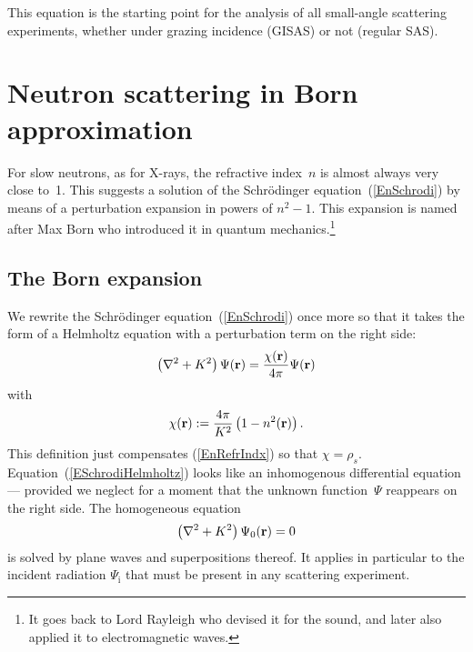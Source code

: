 This equation is the starting point for the analysis of all
small-angle scattering experiments,
whether under grazing incidence (GISAS) or not (regular SAS).


\section{Neutron scattering in Born approximation}

For slow neutrons, as for X-rays, the refractive index~$n$ is almost always
very close to~1.
This suggests a solution of the Schrödinger equation~(\ref{EnSchrodi})
by means of a perturbation expansion in powers of $n^2-1$.
This expansion is named after Max Born
who introduced it in quantum mechanics.\footnote
{It goes back to Lord Rayleigh
who devised it for the sound,
and later also applied it to electromagnetic waves.}

\subsection{The Born expansion}\label{SBorn}


We rewrite the Schrödinger equation~(\ref{EnSchrodi})
once more so that it takes the form of a Helmholtz equation
with a perturbation term on the right side:
\begin{equation}\label{ESchrodiHelmholtz}
  \left(\mathbf{\nabla}^2+K^2\right)\Psi(\mathbf{r})
  = \frac{\chi(\mathbf{r})}{4\pi}\Psi(\mathbf{r})
\end{equation}
with
\begin{equation}\label{EChiDef}
  \chi(\mathbf{r}) := \frac{4\pi}{K^2}\left(1-n^2(\mathbf{r})\right).
\end{equation}
This definition just compensates (\ref{EnRefrIndx}) so that $\chi=\rho_s$.
Equation~(\ref{ESchrodiHelmholtz}) looks
like an inhomogenous differential equation ---
provided we neglect for a moment that the unknown function~$\Psi$
reappears on the right side.
The homogeneous equation
\begin{equation}\label{EHelmholtzHomog}
  \left(\mathbf{\nabla}^2+K^2\right)\Psi_0(\mathbf{r}) = 0
\end{equation}
is solved by plane waves and superpositions thereof.
It applies in particular to the incident radiation
$\Psi_\text{i}$ that must be present in any scattering experiment.

